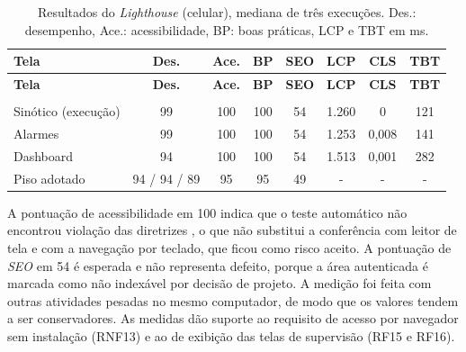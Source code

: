 {\renewcommand{\arraystretch}{1.3}\small
\begin{xltabular}{\textwidth}{Xccccccc}
        \caption{Resultados do \emph{Lighthouse} (celular), mediana de três execuções. Des.: desempenho, Ace.: acessibilidade, BP: boas práticas, LCP e TBT em ms.}
        \label{tab:cap7_lighthouse}\\
        \hline
        \textbf{Tela} & \textbf{Des.} & \textbf{Ace.} & \textbf{BP} & \textbf{SEO} & \textbf{LCP} & \textbf{CLS} & \textbf{TBT} \\
        \hline
        \endfirsthead
        \hline
        \textbf{Tela} & \textbf{Des.} & \textbf{Ace.} & \textbf{BP} & \textbf{SEO} & \textbf{LCP} & \textbf{CLS} & \textbf{TBT} \\
        \hline
        \endhead
        \endfoot
         \\
        \endlastfoot
        Sinótico (execução) & 99 & 100 & 100 & 54 & 1.260 & 0 & 121 \\
        \hline
        Alarmes & 99 & 100 & 100 & 54 & 1.253 & 0,008 & 141 \\
        \hline
        Dashboard & 94 & 100 & 100 & 54 & 1.513 & 0,001 & 282 \\
        \hline
        Piso adotado & 94 / 94 / 89 & 95 & 95 & 49 & - & - & - \\
        \hline
\end{xltabular}}

\par A pontuação de acessibilidade em 100 indica que o teste automático não encontrou violação das diretrizes , o que não substitui a conferência com leitor de tela e com a navegação por teclado, que ficou como risco aceito. A pontuação de \emph{SEO} em 54 é esperada e não representa defeito, porque a área autenticada é marcada como não indexável por decisão de projeto. A medição foi feita com outras atividades pesadas no mesmo computador, de modo que os valores tendem a ser conservadores. As medidas dão suporte ao requisito de acesso por navegador sem instalação (RNF13) e ao de exibição das telas de supervisão (RF15 e RF16).


